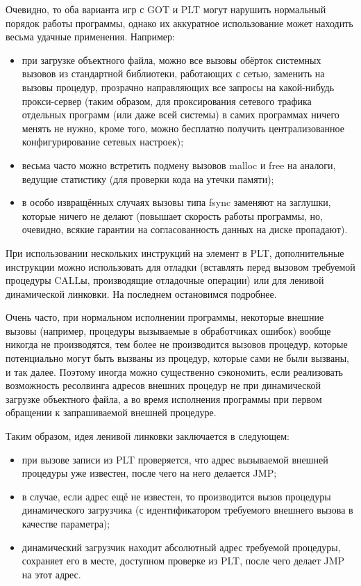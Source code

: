 Очевидно, то оба варианта игр с GOT и PLT могут нарушить нормальный порядок работы программы, однако их аккуратное использование может находить весьма удачные применения.
Например:
\begin{itemize}
    \item при загрузке объектного файла, можно все вызовы обёрток системных вызовов из стандартной библиотеки, работающих с сетью, заменить на вызовы процедур, прозрачно направляющих все запросы на какой-нибудь прокси-сервер (таким образом, для проксирования сетевого трафика отдельных программ (или даже всей системы) в самих программах ничего менять не нужно, кроме того, можно бесплатно получить централизованное конфигурирование сетевых настроек);
    \item весьма часто можно встретить подмену вызовов malloc и free на аналоги, ведущие статистику (для проверки кода на утечки памяти);
    \item в особо извращённых случаях вызовы типа fsync заменяют на заглушки, которые ничего не делают (повышает скорость работы программы, но, очевидно, всякие гарантии на согласованность данных на диске пропадают).
\end{itemize}
При использовании нескольких инструкций на элемент в PLT, дополнительные инструкции можно использовать для отладки (вставлять перед вызовом требуемой процедуры CALLы, производящие отладочные операции) или для ленивой динамической линковки.
На последнем остановимся подробнее.

Очень часто, при нормальном исполнении программы, некоторые внешние вызовы (например, процедуры вызываемые в обработчиках ошибок) вообще никогда не производятся, тем более не производится вызовов процедур, которые потенциально могут быть вызваны из процедур, которые сами не были вызваны, и так далее.
Поэтому иногда можно существенно сэкономить, если реализовать возможность ресолвинга адресов внешних процедур не при динамической загрузке объектного файла, а во время исполнения программы при первом обращении к запрашиваемой внешней процедуре.

Таким образом, идея ленивой линковки заключается в следующем:
\begin{itemize}
    \item при вызове записи из PLT проверяется, что адрес вызываемой внешней процедуры уже известен, после чего на него делается JMP;
    \item в случае, если адрес ещё не известен, то производится вызов процедуры динамического загрузчика (с идентификатором требуемого внешнего вызова в качестве параметра);
    \item динамический загрузчик находит абсолютный адрес требуемой процедуры, сохраняет его в месте, доступном проверке из PLT, после чего делает JMP на этот адрес.
\end{itemize}


